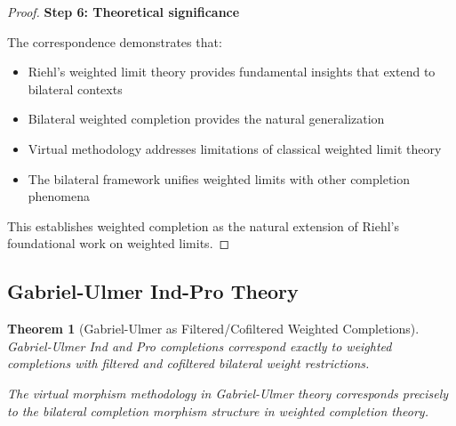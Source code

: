 \documentclass[11pt]{article}
\theoremstyle{plain}
\newtheorem{theorem}{Theorem}[section]
\theoremstyle{definition}
\theoremstyle{remark}
\begin{document}
\begin{proof}
\textbf{Step 6: Theoretical significance}

The correspondence demonstrates that:
\begin{itemize}
\item Riehl's weighted limit theory provides fundamental insights that extend to bilateral contexts
\item Bilateral weighted completion provides the natural generalization
\item Virtual methodology addresses limitations of classical weighted limit theory
\item The bilateral framework unifies weighted limits with other completion phenomena
\end{itemize}

This establishes weighted completion as the natural extension of Riehl's foundational work on weighted limits.
\end{proof}

\subsection{Gabriel-Ulmer Ind-Pro Theory}

\begin{theorem}[Gabriel-Ulmer as Filtered/Cofiltered Weighted Completions]\label{thm:gabriel-ulmer-correspondence}
Gabriel-Ulmer Ind and Pro completions \cite{gabriel1971lokal} correspond exactly to weighted completions with filtered and cofiltered bilateral weight restrictions.

The virtual morphism methodology in Gabriel-Ulmer theory corresponds precisely to the bilateral completion morphism structure in weighted completion theory.
\end{theorem}
\end{document}
